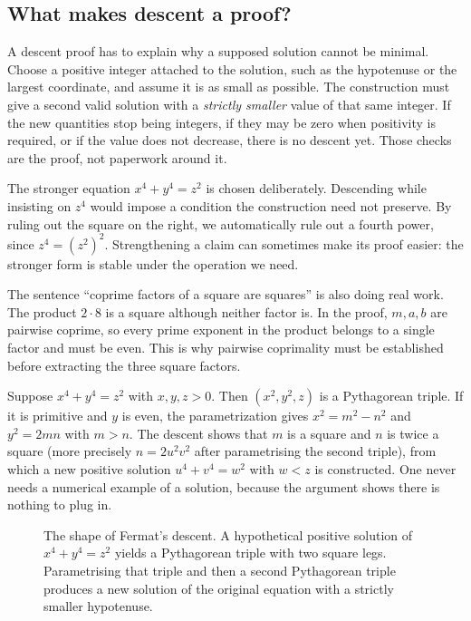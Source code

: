 \subsection*{What makes descent a proof?}
A descent proof has to explain why a supposed solution cannot be minimal. Choose a positive integer attached to the solution, such as the hypotenuse or the largest coordinate, and assume it is as small as possible. The construction must give a second valid solution with a \emph{strictly smaller} value of that same integer. If the new quantities stop being integers, if they may be zero when positivity is required, or if the value does not decrease, there is no descent yet. Those checks are the proof, not paperwork around it.

The stronger equation $x^4+y^4=z^2$ is chosen deliberately. Descending while insisting on $z^4$ would impose a condition the construction need not preserve. By ruling out the square on the right, we automatically rule out a fourth power, since $z^4=(z^2)^2$. Strengthening a claim can sometimes make its proof easier: the stronger form is stable under the operation we need.

The sentence ``coprime factors of a square are squares'' is also doing real work. The product $2\cdot8$ is a square although neither factor is. In the proof, $m,a,b$ are pairwise coprime, so every prime exponent in the product belongs to a single factor and must be even. This is why pairwise coprimality must be established before extracting the three square factors.

\begin{examplex}
Suppose $x^4+y^4=z^2$ with $x,y,z>0$. Then $(x^2,y^2,z)$ is a Pythagorean triple. If it is primitive and $y$ is even, the parametrization gives $x^2=m^2-n^2$ and $y^2=2mn$ with $m>n$. The descent shows that $m$ is a square and $n$ is twice a square (more precisely $n=2u^2v^2$ after parametrising the second triple), from which a new positive solution $u^4+v^4=w^2$ with $w<z$ is constructed. One never needs a numerical example of a solution, because the argument shows there is nothing to plug in.
\end{examplex}

\begin{figure}[ht]
\centering
{}
\caption{The shape of Fermat's descent. A hypothetical positive solution of $x^4+y^4=z^2$ yields a Pythagorean triple with two square legs. Parametrising that triple and then a second Pythagorean triple produces a new solution of the original equation with a strictly smaller hypotenuse.}
\label{fig:t1-descent}
\end{figure}


